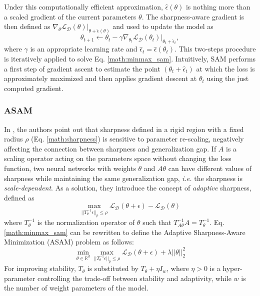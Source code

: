 Under this computationally efficient approximation, 
$\hat{\epsilon}(\theta)$ is nothing more than a scaled gradient of the current parameters $\theta$. The sharpness-aware gradient is then defined as $\nabla_{\theta}\mathcal{L}_\mathcal{D}(\theta)|_{\theta + \hat{\epsilon}(\theta)}$ and used to update the model as 
\begin{equation}
\theta_{t+1} \leftarrow \theta_{t} - \gamma \nabla_{\theta_t}\mathcal{L}_\mathcal{D}(\theta_t)|_{\theta_t + \hat{\epsilon}_t}, \label{math:sam_update}
\end{equation}
where $\gamma$ is an appropriate learning rate and $\hat{\epsilon}_t = \hat{\epsilon}(\theta_t)$. This two-steps procedure is iteratively applied to solve Eq. \ref{math:minmax_sam}. Intuitively, SAM performs a first step of gradient ascent to estimate the point $(\theta_t + \hat{\epsilon}_t)$ at which the loss is approximately maximized and then applies gradient descent at $\theta_t$ using the just computed gradient.

\subsubsection{ASAM} In \cite{kwon2021asam}, the authors point out that sharpness defined in a rigid region with a fixed radius $\rho$ (Eq. \ref{math:sharpness}) is sensitive to parameter re-scaling, negatively affecting the connection between sharpness and generalization gap. If $A$ is a scaling operator acting on the parameters space without changing the loss function,
two neural networks with weights $\theta$ and $A\theta$ can have different values of sharpness while maintaining the same generalization gap, \textit{i.e.} the sharpness is \textit{scale-dependent}. As a solution, they introduce the concept of \textit{adaptive} sharpness, defined as  \begin{equation}
    \max_{||T_{\theta}^{-1}\epsilon||_p \leq \rho}  \mathcal{L}_\mathcal{D}(\theta+\epsilon) - \mathcal{L}_\mathcal{D}(\theta)
    \label{math:adaptive_sharpness}
\end{equation}
where $T_{\theta}^{-1}$ is the normalization operator of $\theta$ such that $T_{A\theta}^{-1}A = T_{\theta}^{-1}$. Eq. \ref{math:minmax_sam} can be rewritten to define the Adaptive Sharpness-Aware Minimization (ASAM) problem as follows:
\begin{equation}
    \min_{\theta\in\mathbb{R}^d}\max_{||T_{\theta}^{-1}\epsilon||_p \leq \rho}  \mathcal{L}_\mathcal{D}(\theta+\epsilon) + \lambda ||\theta||_2^2
    \label{math:asam}
\end{equation}
For improving stability, $T_{\theta}$ is substituted by $T_{\theta} + \eta I_w$, where $\eta>0$ is a hyper-parameter controlling the trade-off between stability and adaptivity, while $w$ is the number of weight parameters of the model.

